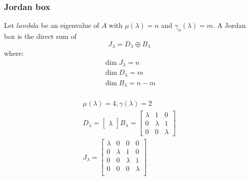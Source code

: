 \subsubsection{Jordan box}
Let \(lambda\) be an eigenvalue of \(A\) with \(\mu(\lambda) = n\) and \( \gamma_a(\lambda) = m \).
A Jordan box is the direct sum of
\begin{equation}
    J_{\lambda} = D_{\lambda} \oplus B_{\lambda}
\end{equation}
where:
\begin{gather*}
    \dim J_{\lambda} = n \\
    \dim D_{\lambda} = m \\
    \dim B_{\lambda} = n - m \\
\end{gather*}
\begin{example}
    \begin{gather*}
        \mu(\lambda) = 4, \gamma(\lambda) = 2 \\
        D_{\lambda} = \begin{bmatrix}
            \lambda
        \end{bmatrix}
        B_{\lambda} = \begin{bmatrix}
            \lambda & 1 & 0 \\ 0 & \lambda & 1 \\ 0 & 0 & \lambda
        \end{bmatrix} \\
        J_{\lambda} = \begin{bmatrix}
            \lambda & 0       & 0       & 0       \\
            0       & \lambda & 1       & 0       \\
            0       & 0       & \lambda & 1       \\
            0       & 0       & 0       & \lambda \\
        \end{bmatrix}
    \end{gather*}
\end{example}
